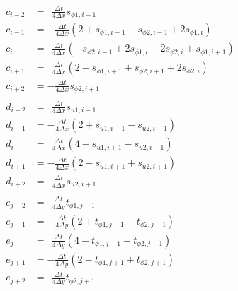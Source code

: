 \documentclass[a4paper]{PRseminar}
\begin{document}
	\clearpage
	\begin{align}
		c_{i-2}&=\ \ \frac{\Delta t}{4\Delta x}s_{\phi1,i-1}\nonumber\\
		c_{i-1}&=-   \frac{\Delta t}{4\Delta x}\left(2+s_{\phi1,i-1}-s_{\phi2,i-1}+2s_{\phi1,i}\right)\nonumber\\
		c_{i  }&=\ \ \frac{\Delta t}{4\Delta x}\left(-s_{\phi2,i-1}+2s_{\phi1,i}-2s_{\phi2,i}+s_{\phi1,i+1}\right)       \\
		c_{i+1}&=\ \ \frac{\Delta t}{4\Delta x}\left(2-s_{\phi1,i+1}+s_{\phi2,i+1}+2s_{\phi2,i}\right)\nonumber\\
		c_{i+2}&=-   \frac{\Delta t}{4\Delta x}s_{\phi2,i+1}\nonumber\\\\
		d_{i-2}&=\ \ \frac{\Delta t}{4\Delta x}s_{u1,i-1}\nonumber\\
		d_{i-1}&=-   \frac{\Delta t}{4\Delta x}\left(2+s_{u1,i-1}-s_{u2,i-1}\right)\nonumber\\
		d_{i  }&=\ \ \frac{\Delta t}{4\Delta x}\left(4-s_{u1,i+1}-s_{u2,i-1}\right)       \\
		d_{i+1}&=-   \frac{\Delta t}{4\Delta x}\left(2-s_{u1,i+1}+s_{u2,i+1}\right)\nonumber\\
		d_{i+2}&=\ \ \frac{\Delta t}{4\Delta x}s_{u2,i+1}\nonumber\\\\
		e_{j-2}&=\ \ \frac{\Delta t}{4\Delta y}t_{\phi1,j-1}\nonumber\\
		e_{j-1}&=-   \frac{\Delta t}{4\Delta y}\left(2+t_{\phi1,j-1}-t_{\phi2,j-1}\right)\nonumber\\
		e_{j  }&=\ \ \frac{\Delta t}{4\Delta y}\left(4-t_{\phi1,j+1}-t_{\phi2,j-1}\right)       \\
		e_{j+1}&=-   \frac{\Delta t}{4\Delta y}\left(2-t_{\phi1,j+1}+t_{\phi2,j+1}\right)\nonumber\\
		e_{j+2}&=\ \ \frac{\Delta t}{4\Delta y}t_{\phi2,j+1}\nonumber\\
	\end{align}
	\clearpage
\end{document}
